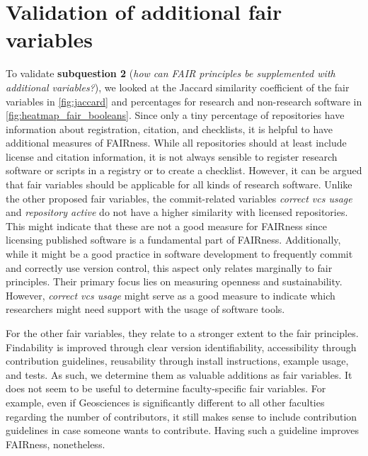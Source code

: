 \section{Validation of additional \acrshort{fair} variables}
\label{sec:disc:sq2}
To validate \textbf{subquestion 2} (\textit{how can FAIR principles be supplemented with additional variables?}), we looked at the Jaccard similarity coefficient of the \acrshort{fair} variables in \autoref{fig:jaccard} and percentages for research and non-research software in \autoref{fig:heatmap_fair_booleans}. Since only a tiny percentage of repositories have information about registration, citation, and checklists, it is helpful to have additional measures of FAIRness. While all repositories should at least include license and citation information, it is not always sensible to register research software or scripts in a registry or to create a checklist. 
However, it can be argued that \acrshort{fair} variables should be applicable for all kinds of research software. Unlike the other proposed \acrshort{fair} variables, the commit-related variables \textit{correct vcs usage} and \textit{repository active} do not have a higher similarity with licensed repositories. This might indicate that these are not a good measure for FAIRness since licensing published software is a fundamental part of FAIRness. Additionally, while it might be a good practice in software development to frequently commit and correctly use version control, this aspect only relates marginally to \acrshort{fair} principles. Their primary focus lies on measuring openness and sustainability. However, \textit{correct vcs usage} might serve as a good measure to indicate which researchers might need support with the usage of software tools.

For the other \acrshort{fair} variables, they relate to a stronger extent to the \acrshort{fair} principles. Findability is improved through clear version identifiability, accessibility through contribution guidelines, reusability through install instructions, example usage, and tests. As such, we determine them as valuable additions as \acrshort{fair} variables. It does not seem to be useful to determine faculty-specific \acrshort{fair} variables. For example, even if Geosciences is significantly different to all other faculties regarding the number of contributors, it still makes sense to include contribution guidelines in case someone wants to contribute. Having such a guideline improves FAIRness, nonetheless.


